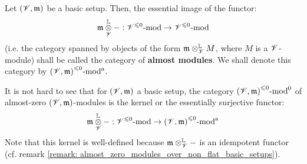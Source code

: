                     \begin{definition} \label{def: almost_modules}
                        Let $(\mathscr{V}, \mathfrak{m})$ be a basic setup. Then, the essential image of the functor:
                            $$\m \tensor_{\scrV}^{\L} -: {\scrV}^{\leq 0}\mod \to {\scrV}^{\leq 0}\mod$$
                        (i.e. the category spanned by objects of the form $\m \tensor_{\scrV}^{\L} M$, where $M$ is a $\mathscr{V}$-module) shall be called the category of \textbf{almost modules}. We shall denote this category by ${(\mathscr{V}, \mathfrak{m})}^{\leqslant 0}\text{-}\mathrm{mod}^{\mathrm{a}}$.
                    \end{definition}
                    \begin{remark} \label{remark: categories_of_almost_zero_modules_are_kernels}
                        It is not hard to see that for $(\mathscr{V}, \mathfrak{m})$ a basic setup, the category ${(\mathscr{V}, \mathfrak{m})}^{\leqslant 0}\text{-}\mathrm{mod}^0$ of almost-zero $(\mathscr{V}, \mathfrak{m})$-modules is the kernel or the essentially surjective functor:
                            $$\m \tensor_{\scrV}^{\L} -: {\scrV}^{\leq 0}\mod \to {(\scrV, \m)}^{\leq 0}\mod^{\almost}$$
                        Note that this kernel is well-defined because $\m \tensor_{\scrV}^{\L} -$ is an idempotent functor (cf. remark \ref{remark: almost_zero_modules_over_non_flat_basic_setups}).
                    \end{remark}
                    
